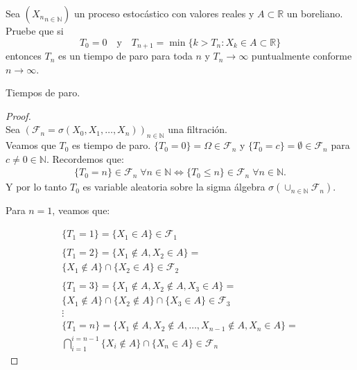 \begin{problema}
	Sea $\left({X_n}_{n\in\mathbb{N}}\right)$ un proceso estocástico con valores reales y $A\subset \mathbb{R}$ un boreliano. 
	Pruebe que si
	$$T_0=0\quad\text{y}\quad T_{n+1}=\min\{k>T_n: X_k\in A \subset \mathbb{R}\}$$
	entonces $T_n$ es un tiempo de paro para toda $n$ y $T_n\to \infty$ puntualmente conforme $n\to\infty$. 

	\begin{categoria} 
		Tiempos de paro.
	\end{categoria}
\end{problema}
		
\begin{proof}
\\

	Sea $(\mathscr{F}_n = \sigma(  X_0, X_1, \dots, X_n ))_{ n \in \mathbb{N}}$ una filtración.
\\

	Veamos que $T_0$ es tiempo de paro. $\{T_0 = 0\} = \Omega \in \mathscr{F}_n$ y 
	$\{T_0 = c\} = \emptyset \in \mathscr{F}_n$ para $c \not= 0 \in \mathbb{N}$. Recordemos que:		
	\begin{align}\label{problema_1_1:equivalencia_varable_aleatoria}
		\{T_0 = n\} \in \mathscr{F}_n \; \forall n \in \mathbb{N} \iff 
		\{T_0 \leq n\} \in \mathscr{F}_n \; \forall n \in \mathbb{N}.
	\end{align}
	Y por lo tanto $T_0$ es variable aleatoria sobre la sigma álgebra $\sigma(\cup_{n \in \mathbb{N}} 
	\mathscr{F}_n)$.

	Para $n=1$, veamos que:
 
	\begin{align}
			\{T_1 = 1\} = \{ X_1 \in A \} 
			\in \mathscr{F}_1 
		\\	\\
			\{T_1 = 2\} = \{ X_1 \not\in A, X_2 \in A \} = \\ 
			\{ X_1 \not\in A \} \cap \{X_2 \in A \}  
			\in \mathscr{F}_2	
		\\ \\
			\{T_1 = 3\} = 
			\{ X_1 \not\in A, X_2 \not\in A,  X_3 \in A \} = \\
			\{ X_1 \not\in A \} \cap \{ X_2 \not\in A \} \cap \{X_3 \in A \} 
			\in \mathscr{F}_3
		\\
			\vdots
		\\
			\{T_1 = n\} = 
			\{ X_1 \not\in A, X_2 \not\in A, \dots, X_{n-1} \not\in A, X_n \in A \} = \\
			\bigcap_{i=1}^{i=n-1} \{ X_i \not\in A \} \cap \{X_n \in A \} 
			\in \mathscr{F}_n
	\end{align} 
 

\end{proof}
